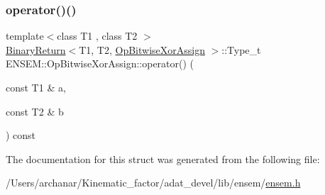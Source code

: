 \mbox{\label{structENSEM_1_1OpBitwiseXorAssign_a4052fafdb4677ce5a429ae23383ed469}} 
\subsubsection{\texorpdfstring{operator()()}{operator()()}\hspace{0.1cm}{\footnotesize\ttfamily [2/2]}}
{\footnotesize\ttfamily template$<$class T1 , class T2 $>$ \\
\mbox{\hyperlink{structENSEM_1_1BinaryReturn}{Binary\+Return}}$<$T1, T2, \mbox{\hyperlink{structENSEM_1_1OpBitwiseXorAssign}{Op\+Bitwise\+Xor\+Assign}} $>$\+::Type\+\_\+t E\+N\+S\+E\+M\+::\+Op\+Bitwise\+Xor\+Assign\+::operator() (\begin{DoxyParamCaption}\item[{const T1 \&}]{a,  }\item[{const T2 \&}]{b }\end{DoxyParamCaption}) const\hspace{0.3cm}{\ttfamily [inline]}}



The documentation for this struct was generated from the following file\+:\begin{DoxyCompactItemize}
\item 
/\+Users/archanar/\+Kinematic\+\_\+factor/adat\+\_\+devel/lib/ensem/\mbox{\hyperlink{lib_2ensem_2ensem_8h}{ensem.\+h}}\end{DoxyCompactItemize}
